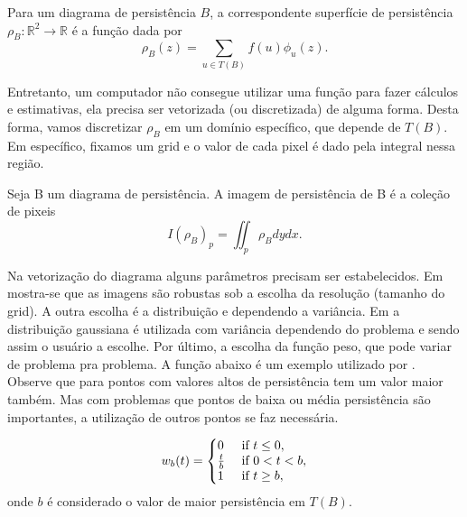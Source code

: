 \begin{defi}
    Para um diagrama de persistência $B$, a correspondente superfície de persistência $\rho_B \colon \mathbb{R}^2
    \to \mathbb{R}$ é a função dada por 
    \begin{equation*}
        \rho_B(z) = \sum_{u \in T(B)} f(u) \phi_u(z). 
    \end{equation*}
\end{defi}

Entretanto, um computador não consegue utilizar uma função para fazer cálculos e estimativas, ela precisa
ser vetorizada (ou discretizada) de alguma forma. Desta forma, vamos discretizar $\rho_B$ em um domínio específico,
que depende de $T(B)$. Em específico, fixamos um grid e o valor de cada pixel é dado pela integral nessa região.

\begin{defi}
    Seja B um diagrama de persistência. A imagem de persistência de B é a coleção de pixeis 
    \begin{equation*}
        I(\rho_B)_p = \iint_p \rho_B dydx.
    \end{equation*}
\end{defi}

Na vetorização do diagrama alguns parâmetros precisam ser estabelecidos. Em \cite{Adams2017} mostra-se que
as imagens são robustas sob a escolha da resolução (tamanho do grid). A outra escolha é a distribuição e dependendo
a variância. Em \cite{Adams2017} a distribuição gaussiana é utilizada com variância dependendo do problema e 
sendo assim o usuário a escolhe. Por último, a escolha da função peso, que pode variar de problema pra problema.
A função abaixo é um exemplo utilizado por \cite{Adams2017}. Observe que para pontos com valores altos de 
persistência tem um valor maior também. Mas com problemas que pontos de baixa ou média persistência são importantes,
a utilização de outros pontos se faz necessária. 

\begin{equation}\label{eq:weightfunct}
    w_b(t) = \left\{
             \begin{array}{@{}ll@{}} 
                 0           & \text{ if } t \leq 0, \\
                 \frac{t}{b} & \text{ if } 0 < t < b, \\
                 1           & \text{ if } t \geq b, 
             \end{array}\right.
\end{equation}
onde $b$ é considerado o valor de maior persistência em $T(B)$.

